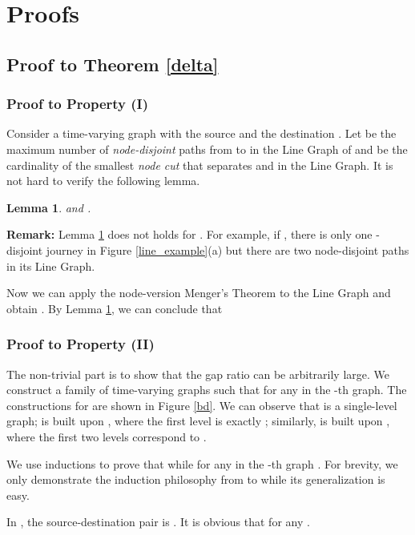 \documentclass[10pt, conference, letterpaper]{IEEEtran}
\newtheorem{lemma}{Lemma}
\begin{document}
\appendix
\section{Proofs}
\subsection{Proof to Theorem \ref{delta}} \label{proof-delta}
\subsubsection{Proof to Property (I)}
Consider a time-varying graph  with the source  and the destination .
Let  be the maximum number of \emph{node-disjoint} paths from  to  in the Line Graph of  and  be the cardinality of the smallest \emph{node cut} that separates  and  in the Line Graph. It is not hard to verify the following lemma.
\begin{lemma}\label{line_eq}
 and .
\end{lemma}

\noindent \textbf{Remark:} Lemma \ref{line_eq} does not holds for . For example, if , there is only one -disjoint journey in Figure \ref{line_example}(a) but there are two node-disjoint paths in its Line Graph.

\vspace{1mm}

Now we can apply the node-version Menger's Theorem to the Line Graph and obtain . By Lemma \ref{line_eq}, we can conclude that

\subsubsection{Proof to Property (II)}
The non-trivial part is to show that the gap ratio can be arbitrarily large. We construct a family of time-varying graphs   such that   for any  in the -th graph. The constructions for  are shown in Figure \ref{bd}. We can observe that  is a single-level graph;  is built upon , where the first level is exactly ; similarly,  is built upon , where the first two levels correspond to .

We use inductions to prove that  while  for any  in the -th graph . For brevity, we only demonstrate the induction philosophy from   to  while its generalization is easy.

\vspace{1mm}

\noindent  In , the source-destination pair is . It is obvious that  for any .
\end{document}
